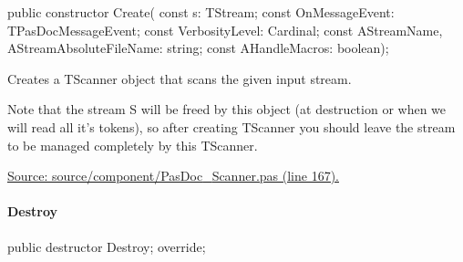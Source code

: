 \documentclass{report}
\newif\ifpdf
\begin{document}
\label{PasDoc_Scanner.TScanner-Create}
\begin{list}{}{
\setlength{\itemindent}{0cm}
\setlength{\listparindent}{0cm}
\setlength{\leftmargin}{\evensidemargin}
\addtolength{\leftmargin}{\tmplength}
\settowidth{\labelsep}{X}
\addtolength{\leftmargin}{\labelsep}
\setlength{\labelwidth}{\tmplength}
}
\item[\textbf{Declaration}\hfill]
\ifpdf
\begin{flushleft}
\fi
\begin{ttfamily}
public constructor Create( const s: TStream; const OnMessageEvent: TPasDocMessageEvent; const VerbosityLevel: Cardinal; const AStreamName, AStreamAbsoluteFileName: string; const AHandleMacros: boolean);\end{ttfamily}

\ifpdf
\end{flushleft}
\fi

\par
\item[\textbf{Description}]
Creates a TScanner object that scans the given input stream.

Note that the stream S will be freed by this object (at destruction or when we will read all it's tokens), so after creating TScanner you should leave the stream to be managed completely by this TScanner.\par
\href{https://github.com/pasdoc/pasdoc/blob/master/source/component/PasDoc_Scanner.pas#L167}{Source: source/component/PasDoc{\_}Scanner.pas (line 167).}

\end{list}
\paragraph*{Destroy}\hspace*{\fill}

\label{PasDoc_Scanner.TScanner-Destroy}
\begin{list}{}{
\setlength{\itemindent}{0cm}
\setlength{\listparindent}{0cm}
\setlength{\leftmargin}{\evensidemargin}
\addtolength{\leftmargin}{\tmplength}
\settowidth{\labelsep}{X}
\addtolength{\leftmargin}{\labelsep}
\setlength{\labelwidth}{\tmplength}
}
\item[\textbf{Declaration}\hfill]
\ifpdf
\begin{flushleft}
\fi
\begin{ttfamily}
public destructor Destroy; override;\end{ttfamily}

\ifpdf
\end{flushleft}
\fi

\end{list}
\end{document}

